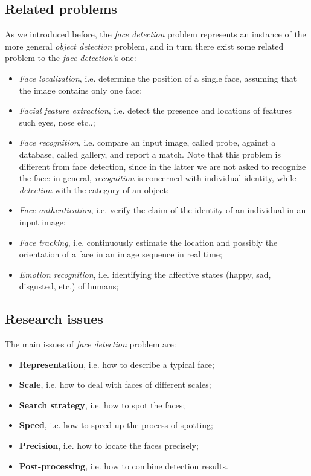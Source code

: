 \subsection{Related problems}
As we introduced before, the \textit{face detection} problem represents an instance of the more general \textit{object detection} problem, and in turn there exist some related problem to the \textit{face detection}'s one:

\begin{itemize}
    \item \textit{Face localization}, i.e. determine the position of a single face, assuming that the image contains only one face;
    \item \textit{Facial feature extraction}, i.e. detect the presence and locations of features such eyes, nose etc..;
    \item \textit{Face recognition}, i.e. compare an input image, called probe, against a database, called gallery, and report a match. Note that this problem is different from face detection, since in the latter we are not asked to recognize the face: in general, \textit{recognition} is concerned with individual identity, while \textit{detection} with the category of an object;
    \item \textit{Face authentication}, i.e. verify the claim of the identity of an individual in an input image;
    \item \textit{Face tracking}, i.e. continuously estimate the location and possibly the orientation of a face in an image sequence in real time;
    \item \textit{Emotion recognition}, i.e. identifying the affective states (happy, sad, disgusted, etc.) of humans;
\end{itemize}

\subsection{Research issues}
The main issues of \textit{face detection} problem are:

\begin{itemize}
    \item \textbf{Representation}, i.e. how to describe a typical face;
    \item \textbf{Scale}, i.e. how to deal with faces of different scales;
    \item \textbf{Search strategy}, i.e. how to spot the faces;
    \item \textbf{Speed}, i.e. how to speed up the process of spotting;
    \item \textbf{Precision}, i.e. how to locate the faces precisely;
    \item \textbf{Post-processing}, i.e. how to combine detection results.
\end{itemize}

